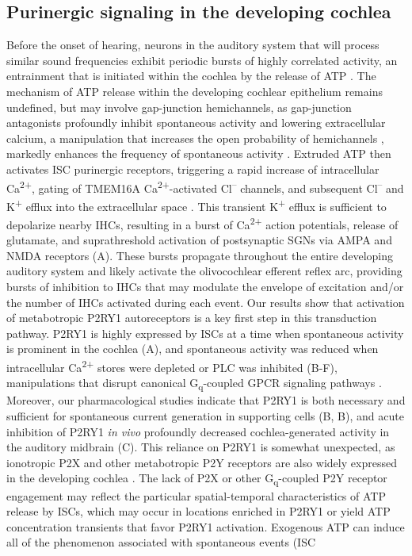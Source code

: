 \documentclass[9pt,lineno]{elife}
\begin{document}
\subsection{Purinergic signaling in the developing cochlea}
Before the onset of hearing, neurons in the auditory system that will process similar sound frequencies exhibit periodic bursts of highly correlated activity, an entrainment that is initiated within the cochlea by the release of ATP \citep{Babola2018,Clause2014,Sonntag2009,Tritsch2010a}. The mechanism of ATP release within the developing cochlear epithelium remains undefined, but may involve gap-junction hemichannels, as gap-junction antagonists profoundly inhibit spontaneous activity and lowering extracellular calcium, a manipulation that increases the open probability of hemichannels \citep{Peracchia2004}, markedly enhances the frequency of spontaneous activity \citep{Tritsch2007}. Extruded ATP then activates ISC purinergic receptors, triggering a rapid increase of intracellular Ca\textsuperscript{2+}, gating of TMEM16A Ca\textsuperscript{2+}-activated Cl\textsuperscript{--} channels, and subsequent Cl\textsuperscript{--} and K\textsuperscript{+} efflux into the extracellular space \citep{Tritsch2007,Wang2015}. This transient K\textsuperscript{+} efflux is sufficient to depolarize nearby IHCs, resulting in a burst of Ca\textsuperscript{2+} action potentials, release of glutamate, and suprathreshold activation of postsynaptic SGNs via AMPA and NMDA receptors \citep{Tritsch2010a,Zhang-Hooks2016} (A). These bursts propagate throughout the entire developing auditory system \citep{Babola2018} and likely activate the olivocochlear efferent reflex arc, providing bursts of inhibition to IHCs that may modulate the envelope of excitation \citep{Clause2014} and/or the number of IHCs activated during each event. Our results show that activation of metabotropic P2RY1 autoreceptors is a key first step in this transduction pathway. P2RY1 is highly expressed by ISCs at a time when spontaneous activity is prominent in the cochlea \citep{Scheffer2015,Tritsch2010} (A), and spontaneous activity was reduced when intracellular Ca\textsuperscript{2+} stores were depleted or PLC was inhibited (B-F), manipulations that disrupt canonical G\textsubscript{q}-coupled GPCR signaling pathways \citep{Erb2012, Fabre1999}. Moreover, our pharmacological studies indicate that P2RY1 is both necessary and sufficient for spontaneous current generation in supporting cells (B, B), and acute inhibition of P2RY1 \textit{in vivo} profoundly decreased cochlea-generated activity in the auditory midbrain (C). This reliance on P2RY1 is somewhat unexpected, as ionotropic P2X and other metabotropic P2Y receptors are also widely expressed in the developing cochlea \citep{Brandle1999,Lahne2008,Liu2015,Nikolic2003,Scheffer2015,Tritsch2007,Eckrich2018}. The lack of P2X or other G\textsubscript{q}-coupled P2Y receptor engagement may reflect the particular spatial-temporal characteristics of ATP release by ISCs, which may occur in locations enriched in P2RY1 or yield ATP concentration transients that favor P2RY1 activation. Exogenous ATP can induce all of the phenomenon associated with spontaneous events (ISC 
\end{document}

